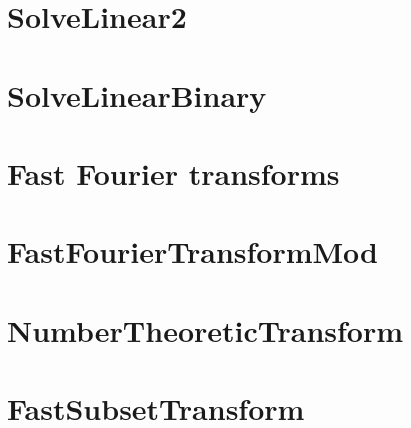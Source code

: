 \section{SolveLinear2}
\section{SolveLinearBinary}
\section{Fast Fourier transforms}
\section{FastFourierTransformMod}
\section{NumberTheoreticTransform}
\section{FastSubsetTransform}
